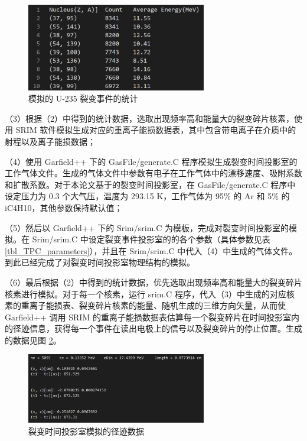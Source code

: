 \documentclass[AutoFakeBold]{LZUThesis}
\begin{document}
\begin{figure}[H]
    \centering
    \includegraphics[width=0.7\textwidth]{figures/statistics.png}
    \caption{模拟的 U-235 裂变事件的统计}
    \label{fig_statistics}
\end{figure}

（3）根据（2）中得到的统计数据，选取出现频率高和能量大的裂变碎片核素，使用 SRIM 软件模拟生成对应的重离子能损数据表，其中包含带电离子在介质中的射程以及离子能损数据\cite{魏康2019基于GEM工艺的裂变时间投影室中裂变碎片的讨论, ziegler2010srim}；

（4）使用 Garfield++ 下的 GasFile/generate.C 程序模拟生成裂变时间投影室的工作气体文件。生成的气体文件中参数有电子在工作气体中的漂移速度、吸附系数和扩散系数\cite{闫洋洋2018用于高精度裂变截面测量的时间投影室}。对于本论文基于的裂变时间投影室，在 GasFile/generate.C 程序中设定压力为 0.3 个大气压，温度为 293.15 K，工作气体为 95\% 的 Ar 和 5\% 的 iC4H10，其他参数保持默认值；

（5）然后以 Garfield++ 下的 Srim/srim.C 为模板，完成对裂变时间投影室的模拟。在 Srim/srim.C 中设定裂变事件投影室的的各个参数（具体参数见表 \ref{tbl_TPC_parameters}），并且在 Srim/srim.C 中代入（4）中生成的气体文件。到此已经完成了对裂变时间投影室物理结构的模拟。

（6）最后根据（2）中得到的统计数据，优先选取出现频率高和能量大的裂变碎片核素进行模拟。对于每一个核素，运行 srim.C 程序，代入（3）中生成的对应核素的重离子能损表、裂变碎片核素的能量、随机生成的三维方向矢量，从而使 Garfield++ 调用 SRIM 的重离子能损数据表估算每一个裂变碎片在时间投影室内的径迹信息，获得每一个事件在读出电极上的信号以及裂变碎片的停止位置。生成的数据见图 \ref{fig_output}。

\begin{figure}[H]
    \centering
    \includegraphics[width=0.7\textwidth]{figures/output.png}
    \caption{裂变时间投影室模拟的径迹数据}
    \label{fig_output}
\end{figure}
\end{document}
